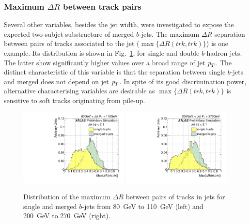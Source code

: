 \subsubsection{Maximum $\Delta R$ between track pairs}  

Several other variables, besides the jet width, were investigated to expose the expected two-subjet substructure of merged $b$-jets.  The maximum $\Delta R$ separation between pairs of tracks associated to the jet ($\max\{\Delta R(trk,trk)\}$) is one example. %
Its distribution is shown in Fig.~\ref{fig:drmaxsinglemerged}, for single and double $b$-hadron jets. The latter show significantly higher values over a broad range of jet ${\emph{p}_{T}}$. The distinct characteristic of this variable is that the separation between single $b$-jets and merged does not depend on jet ${\emph{p}_{T}}$. In spite of its good discrimination power, alternative characterising variables are desirable as $\max\{\Delta R(trk,trk)\}$ is sensitive to soft tracks originating from pile-up. 

\begin{figure}[tp]
\centering
\includegraphics[width=0.49\textwidth]{FIGS/VarsSingleMerged/drmax080.pdf}
\includegraphics[width=0.49\textwidth]{FIGS/VarsSingleMerged/drmax200.pdf}
\caption{Distribution of the maximum $\Delta R$ between pairs of tracks in jets for single and merged $b$-jets from 80~GeV to 110~GeV (left) and 200~GeV to 270~GeV (right).}
\label{fig:drmaxsinglemerged}
\end{figure}


